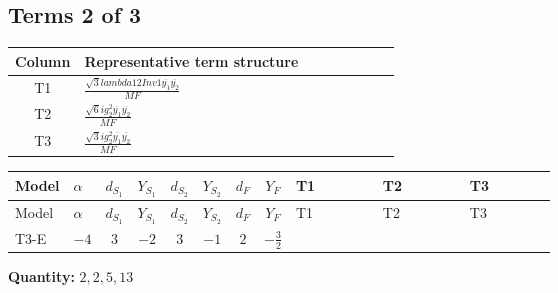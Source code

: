 \documentclass[8pt]{article}
\begin{document}
\begin{landscape}
\subsection*{Terms 2 of 3}
\begin{center}
\begin{tabular}{@{}c >{\raggedright\arraybackslash}p{0.82\linewidth}@{}}
\toprule
Column & Representative term structure \\
\midrule
T1 & \(\displaystyle \frac{\sqrt{3} lambda12Inv1 \overline{y_{1}} \overline{y_{2}}}{MF}\) \\
\midrule
T2 & \(\displaystyle \frac{\sqrt{6} i g_{2}^{2} \overline{y_{1}} \overline{y_{2}}}{MF}\) \\
\midrule
T3 & \(\displaystyle \frac{\sqrt{3} i g_{2}^{2} \overline{y_{1}} \overline{y_{2}}}{MF}\) \\
\midrule
\bottomrule
\end{tabular}
\end{center}
\smallskip
\tiny
\begin{longtable}{@{}llcccccc >{\raggedright\arraybackslash}p{0.21\linewidth} >{\raggedright\arraybackslash}p{0.21\linewidth} >{\raggedright\arraybackslash}p{0.21\linewidth}@{}}
\toprule
Model & $\alpha$ & $d_{S_1}$ & $Y_{S_1}$ & $d_{S_2}$ & $Y_{S_2}$ & $d_F$ & $Y_F$ & T1 & T2 & T3 \\
\midrule
\endfirsthead
\toprule
Model & $\alpha$ & $d_{S_1}$ & $Y_{S_1}$ & $d_{S_2}$ & $Y_{S_2}$ & $d_F$ & $Y_F$ & T1 & T2 & T3 \\
\midrule
\endhead
T3-E & $-4$ & $3$ & $-2$ & $3$ & $-1$ & $2$ & $-\frac{3}{2}$ & \scriptsize\adjustbox{max width=\linewidth}{$\begin{gathered} \frac{\sqrt{3} lambda12Inv1 \overline{y_{1}} \overline{y_{2}}}{6 MF}\end{gathered}$} & \scriptsize\adjustbox{max width=\linewidth}{$\begin{gathered} \frac{\sqrt{6} i g_{2}^{2} \overline{y_{1}} \overline{y_{2}}}{3 MF}\end{gathered}$} & \scriptsize\adjustbox{max width=\linewidth}{$\begin{gathered} \frac{\sqrt{3} i g_{2}^{2} \overline{y_{1}} \overline{y_{2}}}{6 MF}\end{gathered}$} \\
\midrule
\bottomrule
\end{longtable}
\clearpage
\noindent\textbf{Quantity: }$\mathrm{2,2,5,13}$\par\smallskip

\end{landscape}
\end{document}
